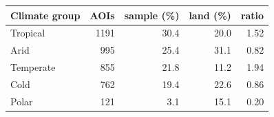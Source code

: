 \begin{tabular}{lrrrr}
\toprule
Climate group & AOIs & sample (\%) & land (\%) & ratio \\
\midrule
Tropical & 1191 & 30.4 & 20.0 & 1.52 \\
Arid & 995 & 25.4 & 31.1 & 0.82 \\
Temperate & 855 & 21.8 & 11.2 & 1.94 \\
Cold & 762 & 19.4 & 22.6 & 0.86 \\
Polar & 121 & 3.1 & 15.1 & 0.20 \\
\bottomrule
\end{tabular}
